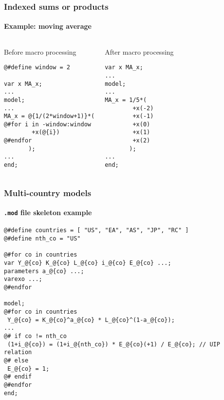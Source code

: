 \documentclass[aspectratio=169]{beamer}
\begin{document}
\begin{frame}[fragile=singleslide]
  \frametitle{Indexed sums or products}
  \framesubtitle{Example: moving average}
  \begin{columns}[T]
    \begin{block}{Before macro processing}
\begin{verbatim}
@#define window = 2

var x MA_x;
...
model;
...
MA_x = @{1/(2*window+1)}*(
@#for i in -window:window
        +x(@{i})
@#endfor
       );
...
end;
\end{verbatim}
    \end{block}
    \begin{block}{After macro processing}
\begin{verbatim}
var x MA_x;
...
model;
...
MA_x = 1/5*(
        +x(-2)
        +x(-1)
        +x(0)
        +x(1)
        +x(2)
       );
...
end;
\end{verbatim}
    \end{block}
  \end{columns}
\end{frame}

\begin{frame}[fragile=singleslide]
  \frametitle{Multi-country models}
  \framesubtitle{\texttt{.mod} file skeleton example}
  \scriptsize
\begin{verbatim}
@#define countries = [ "US", "EA", "AS", "JP", "RC" ]
@#define nth_co = "US"

@#for co in countries
var Y_@{co} K_@{co} L_@{co} i_@{co} E_@{co} ...;
parameters a_@{co} ...;
varexo ...;
@#endfor

model;
@#for co in countries
 Y_@{co} = K_@{co}^a_@{co} * L_@{co}^(1-a_@{co});
...
@# if co != nth_co
 (1+i_@{co}) = (1+i_@{nth_co}) * E_@{co}(+1) / E_@{co}; // UIP relation
@# else
 E_@{co} = 1;
@# endif
@#endfor
end;
\end{verbatim}
  \normalsize
\end{frame}
\end{document}
